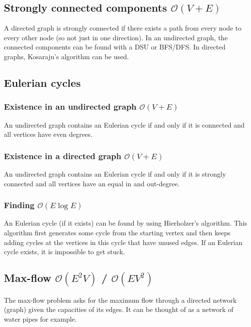 \subsection{Strongly connected components $\mathcal O(V + E)$}
A directed graph is strongly connected if there exists a path from every node to every other node (so not just in one direction). In an undirected graph, the connected components can be found with a DSU or BFS/DFS. In directed graphs, Kosaraju's algorithm can be used.


\subsection{Eulerian cycles}

\subsubsection{Existence in an undirected graph $\mathcal O(V + E)$}
An undirected graph contains an Eulerian cycle if and only if it is connected and all vertices have even degrees.

\subsubsection{Existence in a directed graph $\mathcal O(V + E)$}
An undirected graph contains an Eulerian cycle if and only if it is strongly connected and all vertices have an equal in and out-degree.

\subsubsection{Finding $\mathcal O(E\log E)$}
An Eulerian cycle (if it exists) can be found by using Hierholzer's algorithm. This algorithm first generates some cycle from the starting vertex and then keeps adding cycles at the vertices in this cycle that have unused edges. If an Eulerian cycle exists, it is impossible to get stuck.



\subsection{Max-flow $\mathcal O(E^2V)$ / $\mathcal O(EV^2)$}

The max-flow problem asks for the maximum flow through a directed network (graph) given the capacities of its edges. It can be thought of as a network of water pipes for example.

